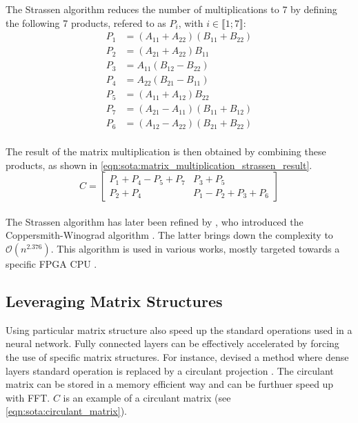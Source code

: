 \noindent The Strassen algorithm reduces the number of multiplications to 7 by
defining the following 7 products, refered to as $P_{i}$, with $i\in \llbracket
  1;7 \rrbracket$:\\

\begin{equation}
  \label{eqn:sota:matrix_multiplication_strassen}
  \begin{aligned}
    P_{1} & = (A_{11} + A_{22})(B_{11} + B_{22}) \\
    P_{2} & = (A_{21} + A_{22})B_{11}            \\
    P_{3} & = A_{11}(B_{12} - B_{22})            \\
    P_{4} & = A_{22}(B_{21} - B_{11})            \\
    P_{5} & = (A_{11} + A_{12})B_{22}            \\
    P_{7} & = (A_{21} - A_{11})(B_{11} + B_{12}) \\
    P_{6} & = (A_{12} - A_{22})(B_{21} + B_{22})
  \end{aligned}
\end{equation}\\

\noindent The result of the matrix multiplication is then obtained by combining
these products, as shown in
\cref{eqn:sota:matrix_multiplication_strassen_result}.\\

\begin{equation}
  \label{eqn:sota:matrix_multiplication_strassen_result}
  C = \begin{bmatrix}
    P_{1} + P_{4} - P_{5} + P_{7} & P_{3} + P_{5}                 \\
    P_{2} + P_{4}                 & P_{1} - P_{2} + P_{3} + P_{6}
  \end{bmatrix}
\end{equation}\\

\noindent The Strassen algorithm has later been refined by
\citeauthor{coppersmith1987matrix}, who introduced the Coppersmith-Winograd
algorithm \cite{coppersmith1987matrix}. The latter brings down the complexity to
$\mathcal{O}(n^{2.376})$. This algorithm is used in various works, mostly
targeted towards a specific \ac{FPGA} \ac{CPU}
\cite{liu2018efficient,lu2018spwa,wang2020winonn}.\\

\subsection{Leveraging Matrix Structures}\label{sec:sota:matrix_structures}
Using particular matrix structure also speed up the standard operations used in
a neural network. Fully connected layers can be effectively accelerated by
forcing the use of specific matrix structures. For instance,
\citeauthor{DBLP:conf/iccv/ChengYFKCC15} devised a method where dense layers
standard operation is replaced by a circulant projection
\cite{DBLP:conf/iccv/ChengYFKCC15}. The circulant matrix can be stored in a
memory efficient way and can be furthuer speed up with \ac{FFT}. $C$ is an
example of a circulant matrix (see \cref{eqn:sota:circulant_matrix}).\\

